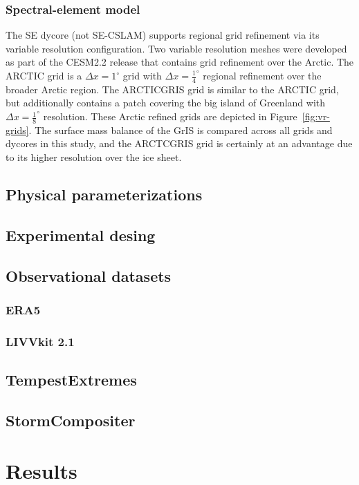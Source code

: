\documentclass[draft]{agujournal2019}
\begin{document}
\subsubsection{Spectral-element model}
The SE dycore (not SE-CSLAM) supports regional grid refinement via its variable resolution configuration. Two variable resolution meshes were developed as part of the CESM2.2 release that contains grid refinement over the Arctic. The ARCTIC grid is a $\Delta x=1^{\circ}$ grid with $\Delta x=\frac{1}{4}^{\circ}$ regional refinement over the broader Arctic region. The ARCTICGRIS grid is similar to the ARCTIC grid, but additionally contains a patch covering the big island of Greenland with $\Delta x=\frac{1}{8}^{\circ}$ resolution. These Arctic refined grids are depicted in Figure~\ref{fig:vr-grids}. The surface mass balance of the GrIS is compared across all grids and dycores in this study, and the ARCTCGRIS grid is certainly at an advantage due to its higher resolution over the ice sheet.
\subsection{Physical parameterizations}
\subsection{Experimental desing}
\subsection{Observational datasets}
\subsubsection{ERA5}
\subsubsection{LIVVkit 2.1}
\subsection{TempestExtremes}
\subsection{StormCompositer}

\section{Results}\label{sec:results}
\end{document}
